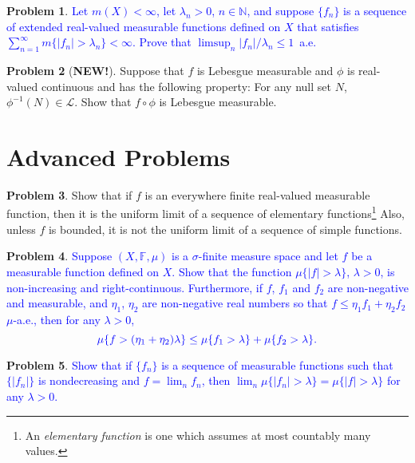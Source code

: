 \documentclass[12pt]{amsart}
\def\field#1{\mathbb{#1}}
\def\abs#1{\lvert {#1} \rvert}
\theoremstyle{definition}
\newtheorem{problem}{Problem}
\theoremstyle{remark}
\begin{document}
\begin{problem}
  \textcolor{blue}{ Let $m(X)<\infty$, let $\lambda_n > 0$, $n \in
  \field{N}$, and suppose $\{ f_n \}$ is a sequence of extended
  real-valued measurable functions defined on $X$ that satisfies
  $\sum_{n=1}^\infty m\{ \abs{f_n} > \lambda_n \} < \infty$.  Prove
  that $\limsup_n \abs{f_n}/\lambda_n \leq 1$~a.e.}
\end{problem}
\begin{problem}[\textbf{NEW!}]
  Suppose that $f$ is Lebesgue measurable and $\phi$ is real-valued
  continuous and has the following property: For any null set $N$,
  $\phi^{-1}(N) \in \mathcal{L}$.  Show that $f \circ \phi$ is
  Lebesgue measurable.
\end{problem}

\section{Advanced Problems}
\begin{problem}
  Show that if $f$ is an everywhere finite real-valued measurable
  function, then it is the uniform limit of a sequence of elementary
  functions\footnote{ An \emph{elementary function} is one which
  assumes at most countably many values.} Also, unless $f$ is bounded,
  it is not the uniform limit of a sequence of simple functions.
\end{problem}
\begin{problem}
  \textcolor{blue}{ Suppose $(X, \field{F}, \mu)$ is a $\sigma$-finite
  measure space and let $f$ be a measurable function defined on
  $X$. Show that the function $\mu\{ \abs{f} > \lambda \}$, $\lambda
  >0$, is non-increasing and right-continuous.  Furthermore, if $f$,
  $f_1$ and $f_2$ are non-negative and measurable, and $\eta_1$,
  $\eta_2$ are non-negative real numbers so that $f \leq \eta_1 f_1 +
  \eta_2 f_2$ $\mu$-a.e., then for any $\lambda > 0$,}
  \begin{equation*}
    \textcolor{blue}{ \mu \{ f > (\eta_1 + \eta_2)\lambda \} \leq \mu
    \{ f_1 > \lambda \} + \mu \{ f_2 > \lambda \}.}
  \end{equation*}
\end{problem}
\begin{problem}
  \textcolor{blue}{ Show that if $\{ f_n \}$ is a sequence of
    measurable functions such that $\{ \abs{ f_n} \}$ is nondecreasing
    and $f = \lim_n f_n$, then $\lim_n \mu \{ \abs{f_n} > \lambda \} =
    \mu \{ \abs{f} > \lambda \}$ for any $\lambda > 0$.}
\end{problem}
\end{document}
